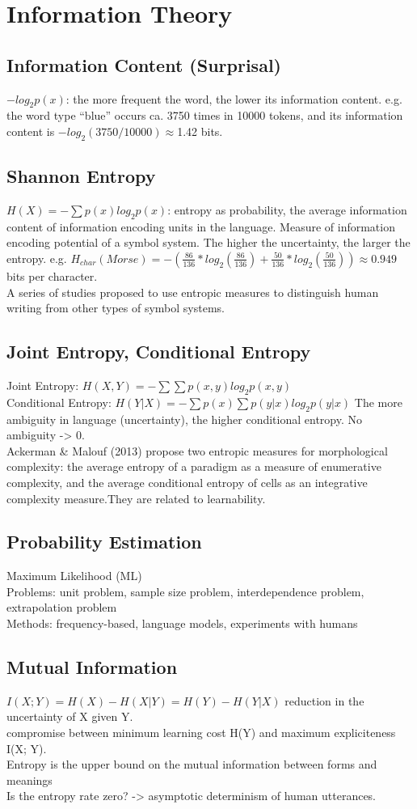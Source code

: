\section{Information Theory}
\subsection*{Information Content (Surprisal)}
$-log_2 p(x)$: the more frequent the word, the lower its information content.
e.g. the word type “blue” occurs ca. 3750 times in
10000 tokens, and its information content is $-log_2(3750/10000) \approx$1.42 bits.
\subsection*{Shannon Entropy}
$H(X) = - \sum p(x) log_2 p(x)$: entropy as probability, the average information content of information encoding units in the language. Measure of information encoding potential of a symbol system. The higher the uncertainty, the larger the entropy. e.g. $H_{char}(Morse) = - (\frac{86}{136} * log_2(\frac{86}{136}) + \frac{50}{136} * log_2(\frac{50}{136})) \approx 0.949$ bits per character. \\
A series of studies proposed to use entropic measures to distinguish human writing from other types of symbol systems.
\subsection*{Joint Entropy, Conditional Entropy}
Joint Entropy: $H(X, Y) = - \sum \sum p(x, y) log_2 p(x, y)$ \\
Conditional Entropy: $H(Y|X) = - \sum p(x) \sum p(y|x) log_2 p(y|x)$ The more ambiguity in language (uncertainty), the higher conditional entropy. No ambiguity -> 0.\\
Ackerman \& Malouf (2013) propose two entropic measures for morphological complexity: the average entropy of a paradigm as a measure of enumerative
complexity, and the average conditional entropy of cells as an integrative complexity measure.They are related to learnability.
\subsection*{Probability Estimation}
Maximum Likelihood (ML) \\
Problems: unit problem, sample size problem, interdependence problem, extrapolation problem \\
Methods: frequency-based, language models, experiments with humans
\subsection*{Mutual Information}
$I(X; Y) = H(X) - H(X|Y) = H(Y) - H(Y|X)$ reduction in the uncertainty of X given Y. \\
compromise between minimum learning cost H(Y) and maximum expliciteness I(X; Y). \\
Entropy is the upper bound on the mutual information between forms and meanings \\
Is the entropy rate zero? -> asymptotic determinism of human utterances.